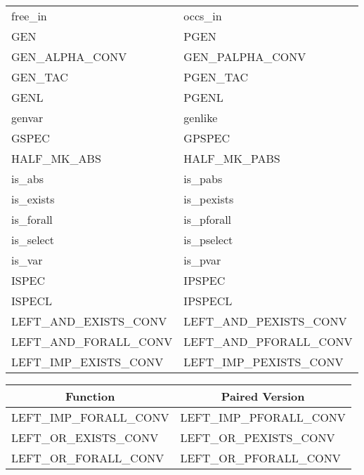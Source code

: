 {\begin{center}
\begin{tabular}[t]{|l|l|}
        free\_in                    &   occs\_in                    \\
        GEN                         &   PGEN                        \\
        GEN\_ALPHA\_CONV            &   GEN\_PALPHA\_CONV           \\
        GEN\_TAC                    &   PGEN\_TAC                   \\
        GENL                        &   PGENL                       \\
        genvar                      &   genlike                     \\
        GSPEC                       &   GPSPEC                      \\
        HALF\_MK\_ABS               &   HALF\_MK\_PABS              \\
        is\_abs                     &   is\_pabs                    \\
        is\_exists                  &   is\_pexists                 \\
        is\_forall                  &   is\_pforall                 \\
        is\_select                  &   is\_pselect                 \\
        is\_var                     &   is\_pvar                    \\
        ISPEC                       &   IPSPEC                      \\
        ISPECL                      &   IPSPECL                     \\
        LEFT\_AND\_EXISTS\_CONV     &   LEFT\_AND\_PEXISTS\_CONV    \\
        LEFT\_AND\_FORALL\_CONV     &   LEFT\_AND\_PFORALL\_CONV    \\
        LEFT\_IMP\_EXISTS\_CONV     &   LEFT\_IMP\_PEXISTS\_CONV    \\  \hline
    \end{tabular}
    \begin{tabular}[t]{|l|l|}                                           \hline
        \multicolumn{1}{|c|}{\normalsize Function}
    &   \multicolumn{1}{|c|}{\normalsize Paired Version}\\              \hline
        LEFT\_IMP\_FORALL\_CONV     &   LEFT\_IMP\_PFORALL\_CONV    \\
        LEFT\_OR\_EXISTS\_CONV      &   LEFT\_OR\_PEXISTS\_CONV     \\
        LEFT\_OR\_FORALL\_CONV      &   LEFT\_OR\_PFORALL\_CONV     \\

\end{tabular}
\end{center}}
